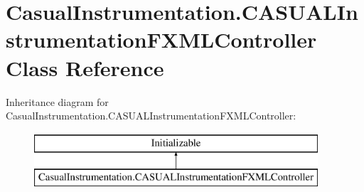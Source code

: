 \hypertarget{class_casual_instrumentation_1_1_c_a_s_u_a_l_instrumentation_f_x_m_l_controller}{\section{Casual\-Instrumentation.\-C\-A\-S\-U\-A\-L\-Instrumentation\-F\-X\-M\-L\-Controller Class Reference}
\label{class_casual_instrumentation_1_1_c_a_s_u_a_l_instrumentation_f_x_m_l_controller}
}
Inheritance diagram for Casual\-Instrumentation.\-C\-A\-S\-U\-A\-L\-Instrumentation\-F\-X\-M\-L\-Controller\-:\begin{figure}[H]
\begin{center}
\leavevmode
\includegraphics[height=2.000000cm]{class_casual_instrumentation_1_1_c_a_s_u_a_l_instrumentation_f_x_m_l_controller}
\end{center}
\end{figure}
